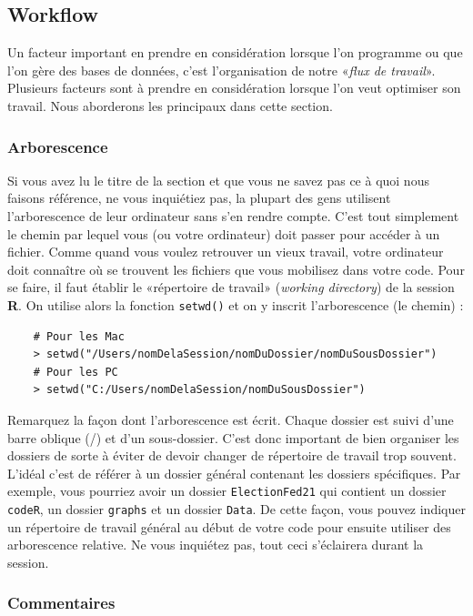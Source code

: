 \documentclass[10.5pt,a4paper]{article}
\begin{document}
  \subsection{Workflow}
  
  Un facteur important en prendre en considération lorsque l'on programme ou que l'on gère des bases de données, c'est l'organisation de notre «\emph{flux de travail}». Plusieurs facteurs sont à prendre en considération lorsque l'on veut optimiser son travail. Nous aborderons les principaux dans cette section.
  
    \subsubsection{Arborescence}
    Si vous avez lu le titre de la section et que vous ne savez pas ce à quoi nous faisons référence, ne vous inquiétiez pas, la plupart des gens utilisent l'arborescence de leur ordinateur sans s'en rendre compte. C'est tout simplement le chemin par lequel vous (ou votre ordinateur) doit passer pour accéder à un fichier. Comme quand vous voulez retrouver un vieux travail, votre ordinateur doit connaître où se trouvent les fichiers que vous mobilisez dans votre code. Pour se faire, il faut établir le «répertoire de travail» (\emph{working directory}) de la session \textbf{R}. On utilise alors la fonction \texttt{setwd()} et on y inscrit l'arborescence (le chemin) :
    
    \begin{lstlisting}
    # Pour les Mac
    > setwd("/Users/nomDelaSession/nomDuDossier/nomDuSousDossier")
    # Pour les PC
    > setwd("C:/Users/nomDelaSession/nomDuSousDossier")
    \end{lstlisting}
    
    Remarquez la façon dont l'arborescence est écrit. Chaque dossier est suivi d'une barre oblique (/) et d'un sous-dossier. C'est donc important de bien organiser les dossiers de sorte à éviter de devoir changer de répertoire de travail trop souvent. L'idéal c'est de référer à un dossier général contenant les dossiers spécifiques. Par exemple, vous pourriez avoir un dossier \texttt{ElectionFed21} qui contient un dossier \texttt{codeR}, un dossier \texttt{graphs} et un dossier \texttt{Data}. De cette façon, vous pouvez indiquer un répertoire de travail général au début de votre code pour ensuite utiliser des arborescence relative. Ne vous inquiétez pas, tout ceci s'éclairera durant la session.
    
    \subsubsection{Commentaires}
    
\end{document}
